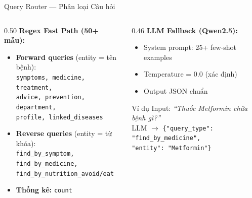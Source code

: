 \documentclass[aspectratio=169, 11pt]{beamer}
\begin{document}
\begin{frame}{Query Router --- Phân loại Câu hỏi}
  \begin{columns}[t]
    \begin{column}{0.50\textwidth}
      \textbf{Regex Fast Path (50+ mẫu):}
      \begin{itemize}
        \scriptsize
        \item \textbf{Forward queries} (entity = tên bệnh):\\
          \texttt{symptoms, medicine, treatment,}\\
          \texttt{advice, prevention, department,}\\
          \texttt{profile, linked\_diseases}
        \item \textbf{Reverse queries} (entity = từ khóa):\\
          \texttt{find\_by\_symptom, find\_by\_medicine,}\\
          \texttt{find\_by\_nutrition\_avoid/eat}
        \item \textbf{Thống kê:} \texttt{count}
      \end{itemize}
    \end{column}
    \begin{column}{0.46\textwidth}
      \textbf{LLM Fallback (Qwen2.5):}
      \begin{itemize}
        \scriptsize
        \item System prompt: 25+ few-shot examples
        \item Temperature = 0.0 (xác định)
        \item Output JSON chuẩn
      \end{itemize}
      \begin{block}{Ví dụ}
        \scriptsize
        Input: \textit{``Thuốc Metformin chữa bệnh gì?''}\\[3pt]
        LLM $\to$ \texttt{\{"query\_type":}\\
        \quad\texttt{"find\_by\_medicine",}\\
        \quad\texttt{"entity": "Metformin"\}}
      \end{block}
    \end{column}
  \end{columns}
\end{frame}
\end{document}
